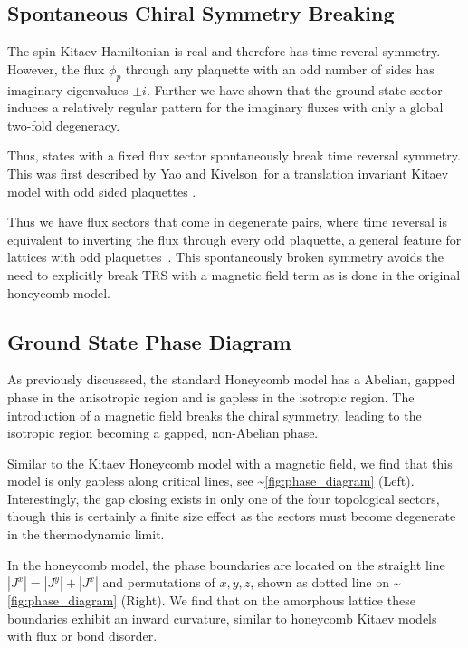 \hypertarget{spontaneous-chiral-symmetry-breaking}{%
\subsection{Spontaneous Chiral Symmetry
Breaking}\label{spontaneous-chiral-symmetry-breaking}}

The spin Kitaev Hamiltonian is real and therefore has time reveral
symmetry. However, the flux \(\phi_p\) through any plaquette with an odd
number of sides has imaginary eigenvalues \(\pm i\). Further we have
shown that the ground state sector induces a relatively regular pattern
for the imaginary fluxes with only a global two-fold degeneracy.

Thus, states with a fixed flux sector spontaneously break time reversal
symmetry. This was first described by Yao and Kivelson~for a translation
invariant Kitaev model with odd sided plaquettes \autocite{Yao2011}.

Thus we have flux sectors that come in degenerate pairs, where time
reversal is equivalent to inverting the flux through every odd
plaquette, a general feature for lattices with odd
plaquettes~\autocite{yaoExactChiralSpin2007,Peri2020}. This
spontaneously broken symmetry avoids the need to explicitly break TRS
with a magnetic field term as is done in the original honeycomb model.

\hypertarget{ground-state-phase-diagram}{%
\subsection{Ground State Phase
Diagram}\label{ground-state-phase-diagram}}

As previously discusssed, the standard Honeycomb model has a Abelian,
gapped phase in the anisotropic region and is gapless in the isotropic
region. The introduction of a magnetic field breaks the chiral symmetry,
leading to the isotropic region becoming a gapped, non-Abelian phase.

Similar to the Kitaev Honeycomb model with a magnetic field, we find
that this model is only gapless along critical lines, see
\textasciitilde{}\ref{fig:phase_diagram} (Left). Interestingly, the gap
closing exists in only one of the four topological sectors, though this
is certainly a finite size effect as the sectors must become degenerate
in the thermodynamic limit.

In the honeycomb model, the phase boundaries are located on the straight
line \(|J^x| = |J^y| + |J^x|\) and permutations of \(x,y,z\), shown as
dotted line on \textasciitilde{}\ref{fig:phase_diagram} (Right). We find
that on the amorphous lattice these boundaries exhibit an inward
curvature, similar to honeycomb Kitaev models with flux
\autocite{Nasu_Thermal_2015} or bond \autocite{knolle_dynamics_2016}
disorder.


